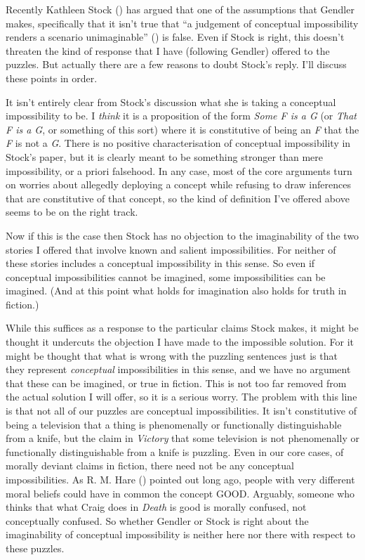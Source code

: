 \documentclass[
  11pt,
  letterpaper,
  DIV=11,
  numbers=noendperiod,
  twoside]{scrartcl}
\begin{document}
Recently Kathleen Stock () has argued that
one of the assumptions that Gendler makes, specifically that it isn't
true that ``a judgement of conceptual impossibility renders a scenario
unimaginable'' () is false.
Even if Stock is right, this doesn't threaten the kind of response that
I have (following Gendler) offered to the puzzles. But actually there
are a few reasons to doubt Stock's reply. I'll discuss these points in
order.

It isn't entirely clear from Stock's discussion what she is taking a
conceptual impossibility to be. I \emph{think} it is a proposition of
the form \emph{Some F is a G} (or \emph{That F is a G}, or something of
this sort) where it is constitutive of being an \emph{F} that the
\emph{F} is not a \emph{G}. There is no positive characterisation of
conceptual impossibility in Stock's paper, but it is clearly meant to be
something stronger than mere impossibility, or a priori falsehood. In
any case, most of the core arguments turn on worries about allegedly
deploying a concept while refusing to draw inferences that are
constitutive of that concept, so the kind of definition I've offered
above seems to be on the right track.

Now if this is the case then Stock has no objection to the imaginability
of the two stories I offered that involve known and salient
impossibilities. For neither of these stories includes a conceptual
impossibility in this sense. So even if conceptual impossibilities
cannot be imagined, some impossibilities can be imagined. (And at this
point what holds for imagination also holds for truth in fiction.)

While this suffices as a response to the particular claims Stock makes,
it might be thought it undercuts the objection I have made to the
impossible solution. For it might be thought that what is wrong with the
puzzling sentences just is that they represent \emph{conceptual}
impossibilities in this sense, and we have no argument that these can be
imagined, or true in fiction. This is not too far removed from the
actual solution I will offer, so it is a serious worry. The problem with
this line is that not all of our puzzles are conceptual impossibilities.
It isn't constitutive of being a television that a thing is phenomenally
or functionally distinguishable from a knife, but the claim in
\emph{Victory} that some television is not phenomenally or functionally
distinguishable from a knife is puzzling. Even in our core cases, of
morally deviant claims in fiction, there need not be any conceptual
impossibilities. As R. M. Hare () pointed
out long ago, people with very different moral beliefs could have in
common the concept GOOD. Arguably, someone who thinks that what Craig
does in \emph{Death} is good is morally confused, not conceptually
confused. So whether Gendler or Stock is right about the imaginability
of conceptual impossibility is neither here nor there with respect to
these puzzles.
\end{document}
